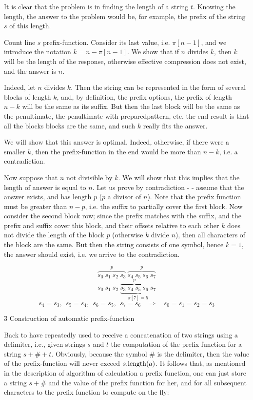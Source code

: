 It is clear that the problem is in finding the length of a string $t$. Knowing the length, the answer to the problem would be, for example, the prefix of the string $s$ of this length.

Count line $s$ prefix-function. Consider its last value, i.e. $\pi[n-1]$, and we introduce the notation $k = n - \pi[n-1]$. We show that if $n$ divides $k$, then $k$ will be the length of the response, otherwise effective compression does not exist, and the answer is $n$.

Indeed, let $n$ divides $k$. Then the string can be represented in the form of several blocks of length $k$, and, by definition, the prefix options, the prefix of length $n-k$ will be the same as its suffix. But then the last block will be the same as the penultimate, the penultimate with preparedpattern, etc. the end result is that all the blocks blocks are the same, and such $k$ really fits the answer.

We will show that this answer is optimal. Indeed, otherwise, if there were a smaller $k$, then the prefix-function in the end would be more than $n-k$, i.e. a contradiction.

Now suppose that $n$ not divisible by $k$. We will show that this implies that the length of answer is equal to $n$. Let us prove by contradiction - - assume that the answer exists, and has length $p$ ($p$ a divisor of $n$). Note that the prefix function must be greater than $n - p$, i.e. the suffix to partially cover the first block. Now consider the second block row; since the prefix matches with the suffix, and the prefix and suffix cover this block, and their offsets relative to each other $k$ does not divide the length of the block $p$ (otherwise $k$ divide $n$), then all characters of the block are the same. But then the string consists of one symbol, hence $k=1$, the answer should exist, i.e. we arrive to the contradiction.

$$ \overbrace{s_0\ s_1\ s_2\ s_3}^{p}\ \overbrace{s_4\ s_5\ s_6\ s_7}^{p} $$
$$ s_0\ s_1\ s_2\ \underbrace{\overbrace{s_3\ s_4\ s_5\ s_6}^{p}\ s_7}_{\pi[7]=5} $$
$$ s_4=s_3,\ \ s_5=s_4,\ \ s_6=s_5,\ \ s_7=s_6\ \ \ \ \Longrightarrow\ \ \ \ s_0=s_1=s_2=s_3 $$


\h3{ Construction of automatic prefix-function }

Back to have repeatedly used to receive a concatenation of two strings using a delimiter, i.e., given strings $s$ and $t$ the computation of the prefix function for a string $s+\#+t$. Obviously, because the symbol $\#$ is the delimiter, then the value of the prefix-function will never exceed $s.{\rm length} (a)$. It follows that, as mentioned in the description of algorithm of calculation a prefix function, one can just store a string $s+\#$ and the value of the prefix function for her, and for all subsequent characters to the prefix function to compute on the fly:


